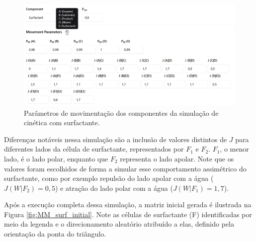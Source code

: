 \documentclass[12pt,oneside]{report}
\begin{document}
\begin{figure}[H]
    \centering
    \includegraphics[width=1\textwidth]{img/movement_MM_surfactant.png}
    \caption{\small Parâmetros de movimentação dos componentes da simulação de cinética com surfactante.}
    \label{fig:michaelis_menten_movement_surfactante}
\end{figure}

Diferenças notáveis nessa simulação são a inclusão de valores distintos de $J$ para diferentes lados da célula de surfactante, representados por $F_1$ e $F_2$. $F_1$, o menor lado, é o lado polar, enquanto que $F_2$ representa o lado apolar. Note que os valores foram escolhidos de forma a simular esse comportamento assimétrico do surfactante, como por exemplo repulsão do lado apolar com a água ($J (W|F_2) = 0{,}5$) e atração do lado polar com a água ($J (W|F_1) = 1{,}7$).

Após a execução completa dessa simulação, a matriz inicial gerada é ilustrada na Figura \ref{fig:MM_surf_initial}. Note as células de surfactante (F) identificadas por meio da legenda e o direcionamento aleatório atribuído a elas, definido pela orientação da ponta do triângulo.
\end{document}

